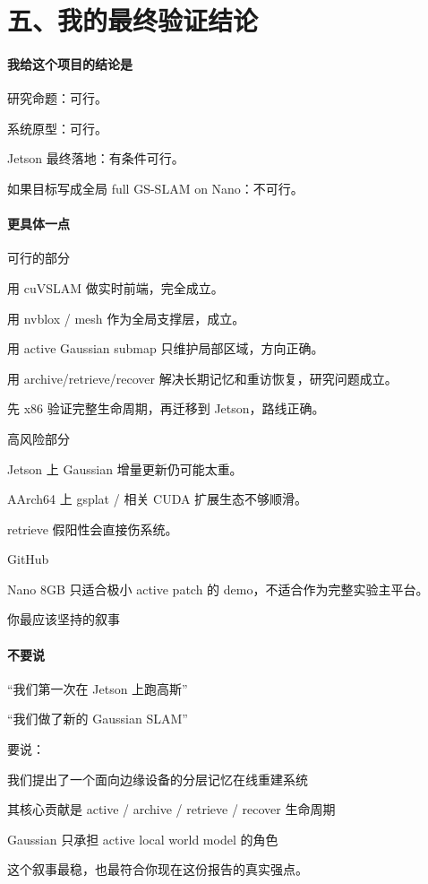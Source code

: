 \documentclass[12pt]{article}
\begin{document}
\section{五、我的最终验证结论}
\paragraph{我给这个项目的结论是}
研究命题：可行。

系统原型：可行。

Jetson 最终落地：有条件可行。

如果目标写成全局 full GS-SLAM on Nano：不可行。

\paragraph{更具体一点}
可行的部分

用 cuVSLAM 做实时前端，完全成立。

用 nvblox / mesh 作为全局支撑层，成立。

用 active Gaussian submap 只维护局部区域，方向正确。

用 archive/retrieve/recover 解决长期记忆和重访恢复，研究问题成立。

先 x86 验证完整生命周期，再迁移到 Jetson，路线正确。

高风险部分

Jetson 上 Gaussian 增量更新仍可能太重。

AArch64 上 gsplat / 相关 CUDA 扩展生态不够顺滑。

retrieve 假阳性会直接伤系统。

GitHub

Nano 8GB 只适合极小 active patch 的 demo，不适合作为完整实验主平台。

你最应该坚持的叙事

\paragraph{不要说}
“我们第一次在 Jetson 上跑高斯”

“我们做了新的 Gaussian SLAM”

要说：

我们提出了一个面向边缘设备的分层记忆在线重建系统

其核心贡献是 active / archive / retrieve / recover 生命周期

Gaussian 只承担 active local world model 的角色

这个叙事最稳，也最符合你现在这份报告的真实强点。
\end{document}
